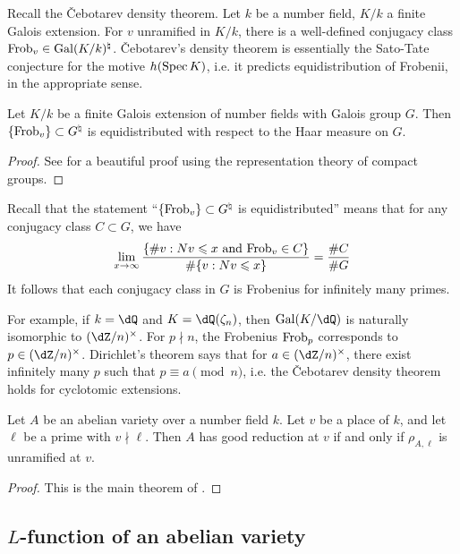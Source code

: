 Recall the \v Cebotarev density theorem. Let $k$ be a number field, $K/k$ a 
finite Galois extension. For $v$ unramified in $K/k$, there is a well-defined 
conjugacy class $\mathrm{Frob}_v\in \operatorname{Gal}(K/k)^\natural$. \v Cebotarev's density theorem 
is essentially the Sato-Tate conjecture for the motive 
$h(\operatorname{Spec} K)$, i.e. it predicts equidistribution of Frobenii, in the appropriate 
sense. 

\begin{theorem}[\v Cebotarev]
Let $K/k$ be a finite Galois extension of number fields with Galois group $G$. Then 
$\{\mathrm{Frob}_v\}\subset G^\natural$ is equidistributed with respect to the Haar 
measure on $G$. 
\end{theorem}
\begin{proof}
See \cite[1.2.2]{se68} for a beautiful proof using the representation theory of 
compact groups. 
\end{proof}

Recall that the statement ``$\{\mathrm{Frob}_v\}\subset G^\natural$ is 
equidistributed'' means that for any conjugacy class $C\subset G$, we have 
\[
  \lim_{x \to \infty} \frac{\{\# v : N v \leqslant x \text{ and } \mathrm{Frob}_v\in C\}}{\# \{v:N v\leqslant x\}} = \frac{\# C}{\# G}
\]
It follows that each conjugacy class in $G$ is Frobenius for infinitely many 
primes.  

For example, if $k=\dQ$ and $K=\dQ(\zeta_n)$, then $\gal(K/\dQ)$ is naturally 
isomorphic to $(\dZ/n)^\times$. For $p\nmid n$, the Frobenius $\mathrm{Frob}_p$ 
corresponds to $p\in (\dZ/n)^\times$. Dirichlet's theorem says that for 
$a\in (\dZ/n)^\times$, there exist infinitely many $p$ such that 
$p\equiv a\pmod n$, i.e. the \v Cebotarev density theorem holds for cyclotomic 
extensions. 

\begin{theorem}
Let $A$ be an abelian variety over a number field $k$. Let $v$ be a place of 
$k$, and let $\ell$ be a prime with $v\nmid \ell$. Then $A$ has good reduction 
at $v$ if and only if $\rho_{A,\ell}$ is unramified at $v$. 
\end{theorem}
\begin{proof}
This is the main theorem of \cite{st68}. 
\end{proof}





\subsection{\texorpdfstring{$L$}{L}-function of an abelian variety}

